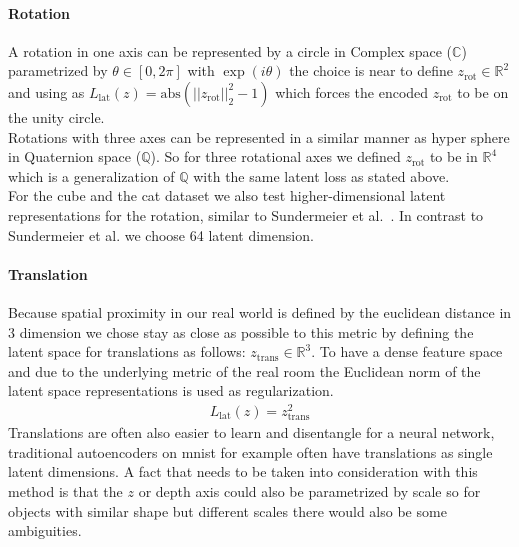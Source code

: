 \documentclass[10pt,a4paper]{article}
\newcommand{\rot}{\ensuremath{\text{rot}\xspace}}
\newcommand{\trans}{\ensuremath{\text{trans}\xspace}}
\begin{document}
\paragraph{Rotation} A rotation in one axis can be represented by a circle in Complex space ($\mathbb{C}$) parametrized by $\theta \in [0, 2 \pi]$ with $\exp(i \theta)$ the choice  is near to define $z_{\rot} \in \mathbb{R}^2$ and using as $L_{\text{lat}}(z) = \text{abs} (||z_{\rot}||_2^2 -1)$ which forces the encoded $z_{\rot}$ to be on the unity circle. \\ 
Rotations with three axes can be represented in a similar manner as hyper sphere in Quaternion space ($\mathbb{Q}$). So for three rotational axes we defined $z_{\rot}$ to be in $\mathbb{R}^4$ which is a generalization of $\mathbb{Q}$ with the same latent loss as stated above.\\
For the cube and the cat dataset we also test higher-dimensional latent
representations for the rotation, similar to Sundermeier et
al.~\cite{3D_Orientation_Learning}. In contrast to Sundermeier et al. we choose
64 latent dimension.
\paragraph{Translation} Because spatial proximity in our real world is defined by the euclidean distance in 3 dimension we chose stay as close as possible to this metric by defining the latent space for translations as follows: $z_{\trans} \in \mathbb{R}^3$. To have a dense feature space and due to the underlying metric of the real room the Euclidean norm of the latent space representations is used as regularization.
\begin{equation}
    \begin{aligned}
        L_{\text{lat}}(z) = z_{\trans}^2
    \end{aligned}
\end{equation}
Translations are often also easier to learn and disentangle for a neural network, traditional autoencoders on mnist for example often have translations as single latent dimensions. A fact that needs to be taken into consideration with this method is that the $z$ or depth axis could also be parametrized by scale so for objects with similar shape but different scales there would also be some ambiguities.

\newpage
\end{document}

